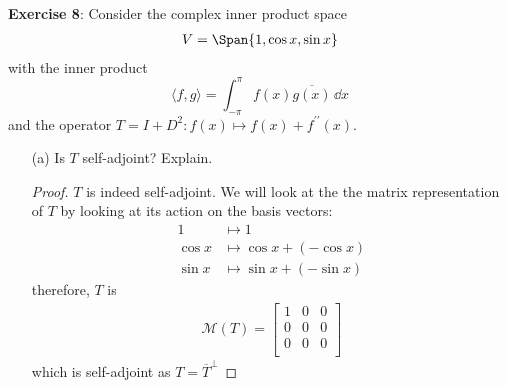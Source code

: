 \documentclass{article}
\begin{document}
\textbf{Exercise 8}: Consider the complex inner product space 
	\begin{align*}
		V = \Span\{1, \cos{x}, \sin{x}\}
	\end{align*}
with the inner product
\begin{equation*}
	\langle f, g \rangle = \int_{-\pi}^{\pi} f(x)\overline{g(x)} \,\dd{x}
\end{equation*}
and the operator $T = I + D^{2}: f(x) \mapsto f(x) + f^{\prime\prime}(x)$.
\begin{enumerate}
	\item [(a)] Is $T$ self-adjoint? Explain.
		\begin{proof}
			$T$ is indeed self-adjoint. We will look at the the matrix representation of $T$ by looking at its action on the basis vectors:
			\begin{align*}
				1 & \mapsto 1 \\ 
				\cos{x} & \mapsto \cos{x} + (-\cos{x}) \\
				\sin{x} & \mapsto \sin{x} + (-\sin{x})
			\end{align*}
			therefore, $T$ is 
			\begin{align*}
				\mathcal{M}(T) = 
				\begin{bmatrix}
					1 & 0 & 0 \\
					0 & 0 & 0 \\
					0 & 0 & 0 \\
				\end{bmatrix}
			\end{align*}
			which is self-adjoint as $T = \overline{T}^{\perp}$
		\end{proof}


\end{enumerate}
\end{document}

